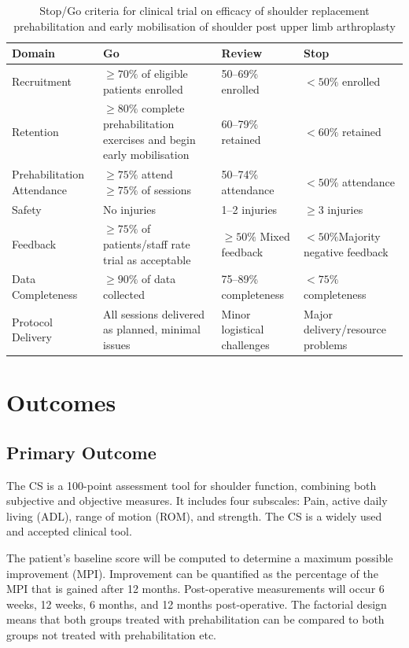 \documentclass[conference]{IEEEtran}
\begin{document}
\begin{table}[!ht]
\centering
\caption{Stop/Go criteria for clinical trial on efficacy of shoulder replacement prehabilitation and early mobilisation of shoulder post upper limb arthroplasty}
\begin{tabular}{|L{2cm}|L{2cm}|L{2cm}|L{2cm}|}
\hline
\textbf{Domain} & \textbf{Go} & \textbf{Review} & \textbf{Stop} \\
\hline
Recruitment & $\geq 70\%$ of eligible patients enrolled & 50–69\% enrolled & $<50\%$ enrolled \\
\hline
Retention & $\geq 80\%$ complete prehabilitation exercises and begin early mobilisation & 60–79\% retained & $<60\%$ retained \\
\hline
Prehabilitation Attendance & $\geq 75\%$ attend $\geq 75\%$ of sessions & 50–74\% attendance & $<50\%$ attendance \\
\hline
Safety & No injuries & 1–2 injuries & $\geq 3$ injuries \\
\hline
Feedback & $\geq 75\%$ of patients/staff rate trial as acceptable & $\geq 50\%$ Mixed feedback & $<50\% $Majority negative feedback \\
\hline
Data Completeness & $\geq 90\%$ of data collected & 75–89\% completeness & $<75\%$ completeness \\
\hline
Protocol Delivery & All sessions delivered as planned, minimal issues & Minor logistical challenges & Major delivery/resource problems \\
\hline
\end{tabular}%
\label{tab:stopgocriteria}
\end{table}

\section{Outcomes}
\subsection{Primary Outcome}
The CS is a 100-point assessment tool for shoulder function, combining both subjective and objective measures. It includes four subscales: Pain, active daily living (ADL), range of motion (ROM), and strength. The CS is a widely used and accepted clinical tool.

The patient's baseline score will be computed to determine a maximum possible improvement (MPI). Improvement can be quantified as the percentage of the MPI that is gained after 12 months. Post-operative measurements will occur 6 weeks, 12 weeks, 6 months, and 12 months post-operative. The factorial design means that both groups treated with prehabilitation can be compared to both groups not treated with prehabilitation etc.
\end{document}
